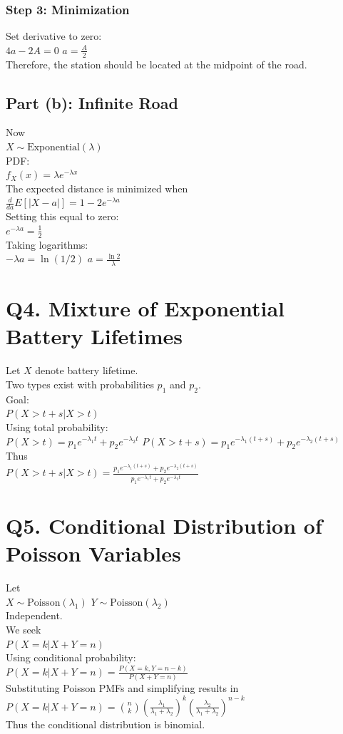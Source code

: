 \documentclass{article}
\begin{document}
\subsubsection{Step 3: Minimization}
Set derivative to zero: \\
$4a-2A=0$ \quad $a=\frac{A}{2}$ \\
Therefore, the station should be located at the midpoint of the road.

\subsection{Part (b): Infinite Road}
Now \\
$X \sim \text{Exponential}(\lambda)$ \\
PDF: \\
$f_X(x)=\lambda e^{-\lambda x}$ \\
The expected distance is minimized when \\
$\frac{d}{da}E[|X-a|]=1-2e^{-\lambda a}$ \\
Setting this equal to zero: \\
$e^{-\lambda a}=\frac{1}{2}$ \\
Taking logarithms: \\
$-\lambda a=\ln(1/2)$ \quad $a=\frac{\ln 2}{\lambda}$

\section{Q4. Mixture of Exponential Battery Lifetimes}
Let $X$ denote battery lifetime. \\
Two types exist with probabilities $p_1$ and $p_2$. \\
Goal: \\
$P(X>t+s|X>t)$ \\
Using total probability: \\
$P(X>t)=p_1e^{-\lambda_1 t}+p_2e^{-\lambda_2 t}$ \quad $P(X>t+s)=p_1e^{-\lambda_1(t+s)}+p_2e^{-\lambda_2(t+s)}$ \\
Thus \\
$P(X>t+s|X>t)= \frac{p_1e^{-\lambda_1(t+s)}+p_2e^{-\lambda_2(t+s)}} {p_1e^{-\lambda_1 t}+p_2e^{-\lambda_2 t}}$

\section{Q5. Conditional Distribution of Poisson Variables}
Let \\
$X\sim \text{Poisson}(\lambda_1)$ \quad $Y\sim \text{Poisson}(\lambda_2)$ \\
Independent. \\
We seek \\
$P(X=k|X+Y=n)$ \\
Using conditional probability: \\
$P(X=k|X+Y=n)= \frac{P(X=k,Y=n-k)}{P(X+Y=n)}$ \\
Substituting Poisson PMFs and simplifying results in \\
$P(X=k|X+Y=n)= \binom{n}{k} \left(\frac{\lambda_1}{\lambda_1+\lambda_2}\right)^k \left(\frac{\lambda_2}{\lambda_1+\lambda_2}\right)^{n-k}$ \\
Thus the conditional distribution is binomial.
\end{document}
